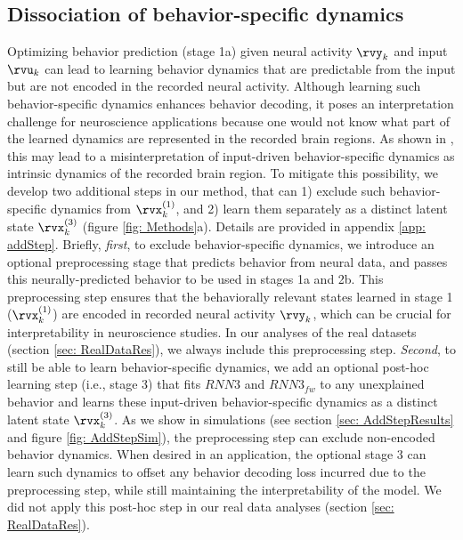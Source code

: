 \documentclass{article} %
\newcommand{\RNN}[1]{\(\textit{RNN#1}\)} %
\newcommand{\RNNfw}[1]{\(\textit{RNN#1}_{fw}\)}
\begin{document}
\subsection{Dissociation of behavior-specific dynamics}\label{sec: AddStep}
Optimizing behavior prediction (stage 1a) given neural activity \(\rvy_{k}\) and input \(\rvu_{k}\) can lead to learning behavior dynamics that are predictable from the input but are not encoded in the recorded neural activity. Although learning such behavior-specific dynamics enhances behavior decoding, it poses an interpretation challenge for neuroscience applications because one would not know what part of the learned dynamics are represented in the recorded brain regions. As shown in \citet{vahidi2024modeling}, this may lead to a misinterpretation of input-driven behavior-specific dynamics as intrinsic dynamics of the recorded brain region. To mitigate this possibility, we develop two additional steps in our method, that can 1) exclude such behavior-specific dynamics from \(\rvx_{k}^{(1)}\), and 2) learn them separately as a distinct latent state \(\rvx_{k}^{(3)}\) (figure \ref{fig: Methods}a). Details are provided in appendix \ref{app: addStep}. Briefly, \textit{first}, to exclude behavior-specific dynamics, we introduce an optional preprocessing stage that predicts behavior from neural data, and passes this neurally-predicted behavior to be used in stages 1a and 2b. This preprocessing step ensures that the behaviorally relevant states learned in stage 1 (\(\rvx_{k}^{(1)}\)) are encoded in recorded neural activity \(\rvy_{k}\), which can be crucial for interpretability in neuroscience studies. In our analyses of the real datasets (section \ref{sec: RealDataRes}), we always include this preprocessing step. \textit{Second}, to still be able to learn behavior-specific dynamics, we add an optional post-hoc learning step (i.e., stage 3) that fits \RNN3 and \RNNfw3 to any unexplained behavior and learns these input-driven behavior-specific dynamics as a distinct latent state \(\rvx_{k}^{(3)}\). As we show in simulations (see section \ref{sec: AddStepResults} and figure \ref{fig: AddStepSim}), the preprocessing step can exclude non-encoded behavior dynamics. When desired in an application, the optional stage 3 can learn such dynamics to offset any behavior decoding loss incurred due to the preprocessing step, while still maintaining the interpretability of the model. We did not apply this post-hoc step in our real data analyses (section \ref{sec: RealDataRes}).
\end{document}
